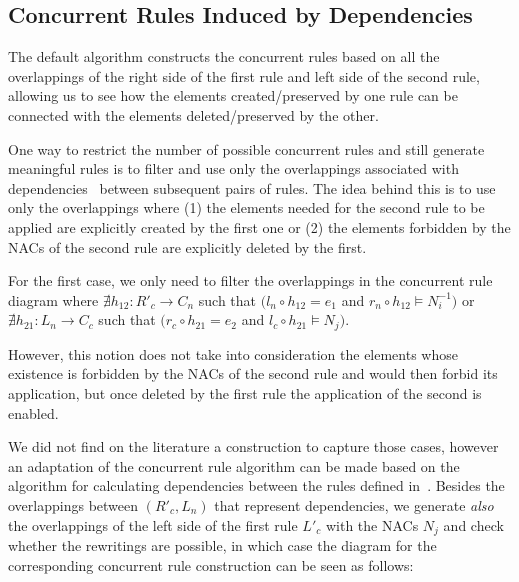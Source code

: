 \subsection{Concurrent Rules Induced by Dependencies}

The default algorithm constructs the concurrent rules based on all the overlappings of the right side of the first rule and left side of the second rule, allowing us to see how the elements created/preserved by one rule can be connected with the elements deleted/preserved by the other.

One way to restrict the number of possible concurrent rules and still generate meaningful rules is to filter and use only the overlappings associated with dependencies~\cite{Lambers2006} between subsequent pairs of rules. The idea behind this is to use only the overlappings where (1) the elements needed for the second rule to be applied are explicitly created by the first one or (2) the elements forbidden by the NACs of the second rule are explicitly deleted by the first.

For the first case, we only need to filter the overlappings in the concurrent rule diagram where $\nexists h_{12} : R'_c \rightarrow C_n$ such that $(l_n \circ h_{12} = e_1$ and $r_n \circ h_{12} \models N^{-1}_i)$ or $\nexists h_{21} : L_n \rightarrow C_c$ such that $(r_c \circ h_{21} = e_2$ and $l_c \circ h_{21} \models N_j)$.

However, this notion does not take into consideration the elements whose existence is forbidden by the NACs of the second rule and would then forbid its application, but once deleted by the first rule the application of the second is enabled.

We did not find on the literature a construction to capture those cases, however an adaptation of the concurrent rule algorithm can be made based on the algorithm for calculating dependencies between the rules defined in~\cite{Lambers2006}. Besides the overlappings between $(R'_c, L_n)$ that represent dependencies, we generate \emph{also} the overlappings of the left side of the first rule $L'_c$ with the NACs $N_j$ and check whether the rewritings are possible, in which case the
diagram for the corresponding concurrent rule construction can be seen as follows:

\vspace{-15pt}


